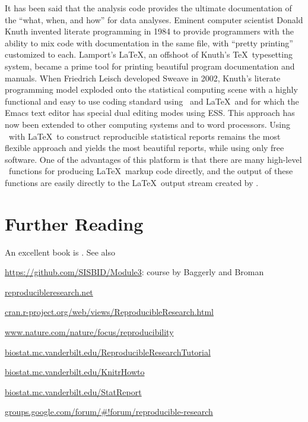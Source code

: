 {\smaller[2]
It has been said that the analysis code provides the ultimate
documentation of the ``what, when, and how'' for data analyses.  Eminent
computer scientist Donald Knuth invented literate programming in 1984
to provide programmers with the ability to mix code with documentation
in the same file, with ``pretty printing'' customized to each.
Lamport's \LaTeX, an offshoot of Knuth's \TeX\ typesetting system, became
a prime tool for printing beautiful program documentation and manuals.
When Friedrich Leisch developed Sweave in 2002, Knuth's literate
programming model exploded onto the statistical computing scene with a
highly functional and easy to use coding standard using \R\ and \LaTeX\
and for which the Emacs text editor has special dual editing modes
using ESS.  This approach has now been extended to other computing
systems and to word processors.  Using \R\ with \LaTeX\ to construct
reproducible statistical reports remains the most flexible approach
and yields the most beautiful reports, while using only free software.
One of the advantages of this platform is that there are many
high-level \R\ functions for producing \LaTeX\ markup code directly, and
the output of these functions are easily directly to the \LaTeX\ output
stream created by \co{knitr}.}

\section{Further Reading}
An excellent book is \citet{irr}.  See also
\bi
\item \url{https://github.com/SISBID/Module3}: course by Baggerly and Broman
\item \url{reproducibleresearch.net}
\item \url{cran.r-project.org/web/views/ReproducibleResearch.html}
\item \url{www.nature.com/nature/focus/reproducibility}
\item \url{biostat.mc.vanderbilt.edu/ReproducibleResearchTutorial}
\item \url{biostat.mc.vanderbilt.edu/KnitrHowto}
\item \url{biostat.mc.vanderbilt.edu/StatReport}
\item \url{groups.google.com/forum/#!forum/reproducible-research}
\ei

    
